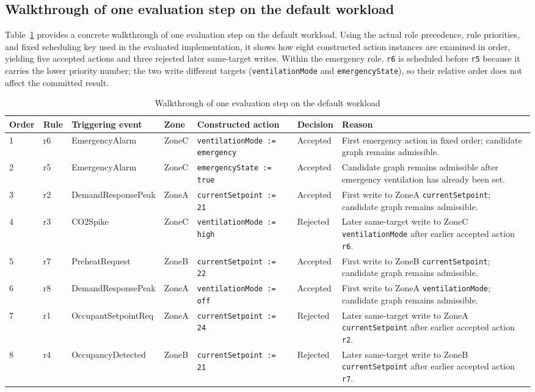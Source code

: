 \documentclass{ieeeaccess}
\theoremstyle{definition}
\theoremstyle{plain}
\theoremstyle{remark}
\begin{document}
\subsection{Walkthrough of one evaluation step on the default workload}
\label{sec:eval:walkthrough}

Table~\ref{tab:default-walkthrough} provides a concrete walkthrough of one evaluation step on the default workload. Using the actual role precedence, rule priorities, and fixed scheduling key used in the evaluated implementation, it shows how eight constructed action instances are examined in order, yielding five accepted actions and three rejected later same-target writes.
Within the emergency role, \texttt{r6} is scheduled before \texttt{r5} because it carries the lower priority number; the two write different targets (\texttt{ventilationMode} and \texttt{emergencyState}), so their relative order does not affect the committed result.

\begin{table}[h]
\caption{Walkthrough of one evaluation step on the default workload}
\label{tab:default-walkthrough}
\centering
\begin{tabular}{|p{0.9cm}|p{1.0cm}|p{2.5cm}|p{1.0cm}|p{2.6cm}|p{1.3cm}|p{5.5cm}|}
\hline
\textbf{Order} & \textbf{Rule} & \textbf{Triggering event} & \textbf{Zone} & \textbf{Constructed action} & \textbf{Decision} & \textbf{Reason} \\
\hline
1 & r6 & EmergencyAlarm & ZoneC & \texttt{ventilationMode := emergency} & Accepted & First emergency action in fixed order; candidate graph remains admissible. \\
\hline
2 & r5 & EmergencyAlarm & ZoneC & \texttt{emergencyState := true} & Accepted & Candidate graph remains admissible after emergency ventilation has already been set. \\
\hline
3 & r2 & DemandResponsePeak & ZoneA & \texttt{currentSetpoint := 21} & Accepted & First write to ZoneA \texttt{currentSetpoint}; candidate graph remains admissible. \\
\hline
4 & r3 & CO2Spike & ZoneC & \texttt{ventilationMode := high} & Rejected & Later same-target write to ZoneC \texttt{ventilationMode} after earlier accepted action \texttt{r6}. \\
\hline
5 & r7 & PreheatRequest & ZoneB & \texttt{currentSetpoint := 22} & Accepted & First write to ZoneB \texttt{currentSetpoint}; candidate graph remains admissible. \\
\hline
6 & r8 & DemandResponsePeak & ZoneA & \texttt{ventilationMode := off} & Accepted & First write to ZoneA \texttt{ventilationMode}; candidate graph remains admissible. \\
\hline
7 & r1 & OccupantSetpointReq & ZoneA & \texttt{currentSetpoint := 24} & Rejected & Later same-target write to ZoneA \texttt{currentSetpoint} after earlier accepted action \texttt{r2}. \\
\hline
8 & r4 & OccupancyDetected & ZoneB & \texttt{currentSetpoint := 21} & Rejected & Later same-target write to ZoneB \texttt{currentSetpoint} after earlier accepted action \texttt{r7}. \\
\hline
\end{tabular}
\end{table}
\end{document}
